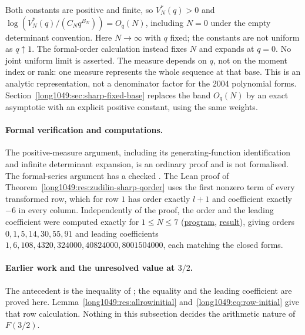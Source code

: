 Both constants are positive and finite, so $V_N^*(q)>0$ and
$\log(V_N^*(q)/(C_Nq^{B_N}))=O_q(N)$, including $N=0$ under the empty
determinant convention.
Here $N\to\infty$ with $q$ fixed; the constants are not uniform as
$q\uparrow1$. The formal-order calculation instead fixes $N$ and expands
at $q=0$. No joint uniform limit is asserted. The measure depends on $q$, not on the moment index or rank: one
measure represents the whole sequence at that base. This is an
analytic representation, not a denominator factor for the 2004
polynomial forms.
Section~\ref{long1049:sec:sharp-fixed-base} replaces the band $O_q(N)$ by an
exact asymptotic with an explicit positive constant, using the same weights.

\paragraph{Formal verification and computations.}
The positive-measure argument, including its generating-function
identification and infinite determinant expansion, is an ordinary proof
and is not formalised. The formal-series argument has a checked
.
The Lean proof of Theorem~\ref{long1049:res:zudilin-sharp-qorder} uses
the first nonzero term of every transformed row, which
for row $1$ has order exactly $l+1$ and coefficient exactly $-6$ in every
column.  Independently of the proof, the order and the
leading coefficient were computed exactly for $1\le N\le7$
(\href{https://github.com/wcook04/plectis-erdos/blob/f5c9e560df38cd32e9b49473a409384aab00d9ae/research/experiments/erdos1049/hankel_qorder.py}{program}, \href{https://github.com/wcook04/plectis-erdos/blob/f5c9e560df38cd32e9b49473a409384aab00d9ae/research/experiments/erdos1049/receipts/hankel-qorder.json}{result}), giving orders
$0,1,5,14,30,55,91$ and leading coefficients
$1,6,108,4320,324000,40824000,8001504000$, each matching the closed forms.

\paragraph{Earlier work and the unresolved value at $3/2$.}
The antecedent is the inequality of \cite[Sec.~4, p.~7]{zudilin2016}; the equality and
the leading coefficient are proved here.
Lemma~\ref{long1049:res:allrowinitial} and~\eqref{long1049:eq:row-initial}
give that row calculation.  Nothing in
this subsection decides the arithmetic nature of $F(3/2)$.


